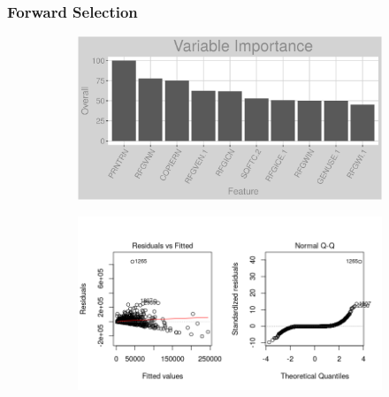 \subsubsection{Forward Selection}
\label{appendix:electricity:lp}
\begin{figure}[h]
\centering
\begin{subfigure}{1\textwidth}
\centering
\includegraphics[width=.99\textwidth, height=0.3\textheight]{Images/electricity_lp_vars.png}
\end{subfigure}
\begin{subfigure}{1\textwidth}
\centering
\includegraphics[width=.99\textwidth, height=0.475\textheight]{Images/electricity_lp_res_1.png}
\end{subfigure}
\end{figure}
\newpage
